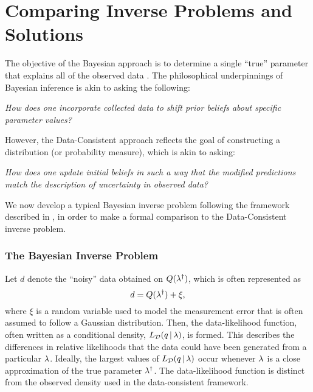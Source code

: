 \section{Comparing Inverse Problems and Solutions}\label{sec:compare}

The objective of the Bayesian approach is to determine a single ``true'' parameter that explains all of the observed data \citep{Smith, Concrete, Complete, Stuart10, Tarantola_book}.
The philosophical underpinnings of Bayesian inference is akin to asking the following:

\begin{center}
  \emph{How does one incorporate collected data to shift prior beliefs about specific parameter values?}
\end{center}

However, the Data-Consistent approach reflects the goal of constructing a distribution (or probability measure), which is akin to asking:

\begin{center}
  \emph{How does one update initial beliefs in such a way that the modified predictions match the description of uncertainty in observed data?}
\end{center}

We now develop a typical Bayesian inverse problem following the framework described in \cite{Stuart10, Smith}, in order to make a formal comparison to the Data-Consistent inverse problem.

\subsubsection{The Bayesian Inverse Problem}
Let $d$ denote the ``noisy'' data obtained on $Q(\lambda^\dagger)$, which is often represented as
\begin{equation*}
	d = Q(\lambda^\dagger) + \xi,
\end{equation*}
where $\xi$ is a random variable used to model the measurement error that is often assumed to follow a Gaussian distribution.
Then, the data-likelihood function, often written as a conditional density, $L_{\mathcal{D}}(q \, |\, \lambda)$, is formed.
This describes the differences in relative likelihoods that the data could have been generated from a particular $\lambda$.
Ideally, the largest values of $L_{\mathcal{D}}(q \, | \, \lambda)$ occur whenever $\lambda$ is a close approximation of the true parameter $\lambda^\dagger$.
The data-likelihood function is distinct from the observed density used in the data-consistent framework.

